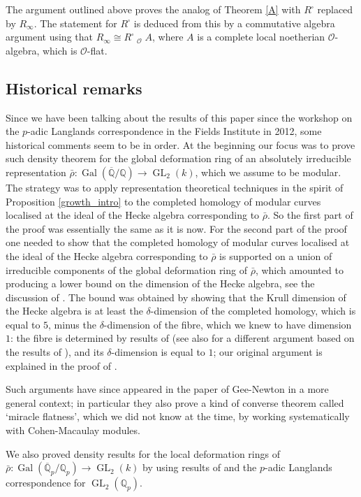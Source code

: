 \documentclass[11pt]{article}
\let\mathcal\mathscr
\newcommand{\ssquare}{{\scriptscriptstyle\square}}
\theoremstyle{definition}
\DeclareMathOperator{\GL}{GL}
\DeclareMathOperator{\Gal}{Gal}
\DeclareMathOperator{\wtimes}{\widehat{\otimes}}
\newcommand{\Qp}{\mathbb {Q}_p}
\newcommand{\Qbar}{\overline{\mathbb{Q}}_p}
\newcommand{\QQ}{\mathbb Q}
\newcommand{\cO}{\mathcal{O}}
\newcommand{\rhobar}{\bar{\rho}}
\begin{document}
The argument outlined above proves the analog of Theorem \ref{A} with $R^\ssquare$ replaced by $R_{\infty}$. The statement for $R^\ssquare$ is deduced from this by a commutative algebra argument using that $R_\infty\cong R^\ssquare\wtimes_{\cO} A$, where $A$ is a complete local noetherian $\cO$-algebra, which is $\cO$-flat.

\subsection{Historical remarks} Since we have been talking about the results of this paper
since the workshop on the $p$-adic Langlands correspondence in the Fields Institute in 2012, some historical comments seem to be in order.
At the beginning our focus was to prove such density theorem for the global deformation ring
of an absolutely irreducible representation $\rhobar: \Gal(\overline{\QQ}/ \QQ)\to \GL_2(k)$,
which we assume to be modular. The strategy was to apply representation theoretical techniques in the
spirit of Proposition \ref{growth_intro} to the completed homology of modular curves localised at the ideal of the Hecke algebra corresponding to $\rhobar$. So the first part of the proof
was essentially the same as it is now. For the second part of the proof one needed to show that the completed homology of modular curves localised at the ideal of the Hecke algebra corresponding to $\rhobar$ is supported on a union of irreducible components of the global deformation ring of $\rhobar$, which amounted to producing a lower bound on the dimension of the Hecke algebra, see the discussion of
\cite[\S 3.1.1]{matt_icm}. The bound was obtained by showing that the Krull dimension of the Hecke
algebra is at least the $\delta$-dimension of the completed homology, which is equal to $5$, minus the
$\delta$-dimension of the fibre, which we knew to have dimension $1$: the fibre is determined by results
of \cite{emfm} (see also \cite[Lem.\,5.8]{padicJL} for a different argument based on the results of
\cite{cmf}), and its $\delta$-dimension is equal to $1$; our original argument is explained in the proof of
\cite[Lem.\,5.14]{padicJL}.

Such arguments have since appeared in the paper of Gee-Newton \cite{gee-newton}
in a more general context; in particular they also prove a kind of converse theorem called `miracle flatness', which we did not know at the time, by working systematically with Cohen-Macaulay modules.

We also proved density results
for the local deformation rings of $\rhobar: \Gal(\Qbar/\Qp)\to \GL_2(k)$ by using results of \cite{cmf} and the $p$-adic Langlands correspondence for $\GL_2(\Qp)$.
\end{document}
